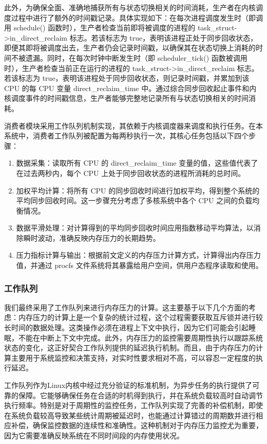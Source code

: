此外，为确保全面、准确地捕获所有与状态切换相关的时间消耗，生产者在内核调度过程中进行了额外的时间戳记录。具体实现如下：在每次进程调度发生时（即调用 schedule() 函数时），生产者检查当前即将被调度的进程的 task\_struct->in\_direct\_reclaim 标志。若该标志为 true，表明该进程正处于同步回收状态，即便其即将被调度出去，生产者仍会记录时间戳，以确保其在状态切换上消耗的时间不被遗漏。同时，在每次时钟中断发生时（即 scheduler\_tick() 函数被调用时），生产者检查当前正在运行的进程的 task\_struct->in\_direct\_reclaim 标志。若该标志为 true，表明该进程处于同步回收状态，则记录时间戳，并累加到该 CPU 的每 CPU 变量 direct\_reclaim\_time 中。通过综合同步回收起止事件和内核调度事件的时间戳信息，生产者能够完整地记录所有与状态切换相关的时间消耗。

消费者模块采用工作队列机制实现，其依赖于内核调度器来调度和执行任务。在本系统中，消费者工作队列被配置为每两秒执行一次，其核心任务包括以下四个步骤：


\begin{enumerate}
    \item 数据采集：读取所有 CPU 的 direct\_reclaim\_time 变量的值，这些值代表了在过去两秒内，每个 CPU 上处于同步回收状态的进程所消耗的总时间。
    \item 加权平均计算：将所有 CPU 的同步回收时间进行加权平均，得到整个系统的平均同步回收时间。这一步骤充分考虑了多核系统中各个 CPU 之间的负载均衡情况。
    \item 数据平滑处理：对计算得到的平均同步回收时间应用指数移动平均算法，以消除瞬时波动，准确反映内存压力的长期趋势。
    \item 压力指标计算与输出：根据前文定义的内存压力计算方式，计算得出内存压力值，并通过 procfs 文件系统将其暴露给用户空间，供用户态程序读取和使用。
\end{enumerate}


\subsubsection{工作队列}
我们最终采用了工作队列来进行内存压力的计算。这主要基于以下几个方面的考虑：内存压力的计算上是一个复杂的统计过程，这个过程需要获取互斥锁并进行较长时间的数据处理。这类操作必须在进程上下文中执行，因为它们可能会引起睡眠，不能在中断上下文中完成。此外，内存压力的监控需要周期性执行以跟踪系统状态的变化，这正好契合工作队列提供的延迟执行机制。而且，由于内存压力的计算主要用于系统监控和决策支持，对实时性要求相对不高，可以容忍一定程度的执行延迟。

工作队列作为Linux内核中经过充分验证的标准机制，为异步任务的执行提供了可靠的保障。它能够确保任务在合适的时机得到执行，并在系统负载较高时自动调节执行频率。特别是对于周期性的监控任务，工作队列实现了完善的补偿机制，即使在系统负载较高导致某些统计周期被延迟时，也能通过计算错过的周期数并进行相应补偿，确保监控数据的连续性和准确性。这种机制对于内存压力监控尤为重要，因为它需要准确反映系统在不同时间段的内存使用状况。

